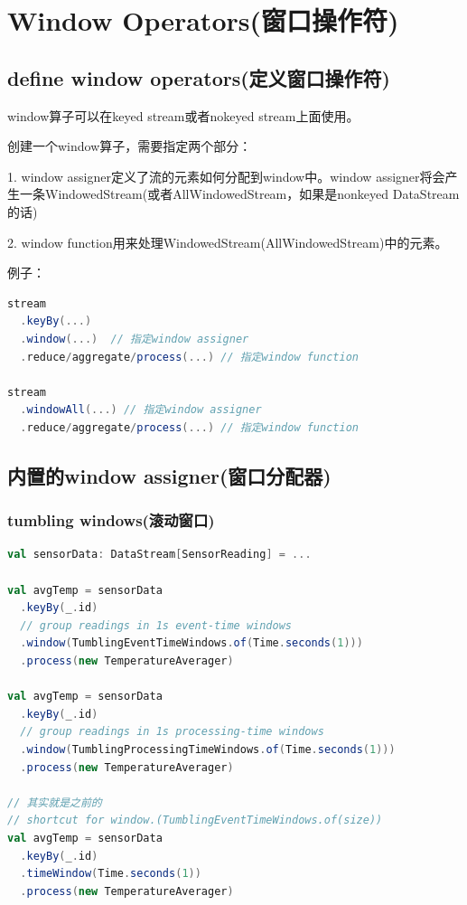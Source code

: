 \documentclass[oneside]{ctexbook}
\begin{document}
\section{Window Operators(窗口操作符)}

\subsection{define window operators(定义窗口操作符)}

window算子可以在keyed stream或者nokeyed stream上面使用。

创建一个window算子，需要指定两个部分：

1. window assigner定义了流的元素如何分配到window中。window assigner将会产生一条WindowedStream(或者AllWindowedStream，如果是nonkeyed DataStream的话)

2. window function用来处理WindowedStream(AllWindowedStream)中的元素。

例子：

\begin{lstlisting}[language=scala]
stream
  .keyBy(...)
  .window(...)  // 指定window assigner
  .reduce/aggregate/process(...) // 指定window function

stream
  .windowAll(...) // 指定window assigner
  .reduce/aggregate/process(...) // 指定window function
\end{lstlisting}

\subsection{内置的window assigner(窗口分配器)}

\subsubsection{tumbling windows(滚动窗口)}

\begin{lstlisting}[language=scala]
val sensorData: DataStream[SensorReading] = ...

val avgTemp = sensorData
  .keyBy(_.id)
  // group readings in 1s event-time windows
  .window(TumblingEventTimeWindows.of(Time.seconds(1)))
  .process(new TemperatureAverager)

val avgTemp = sensorData
  .keyBy(_.id)
  // group readings in 1s processing-time windows
  .window(TumblingProcessingTimeWindows.of(Time.seconds(1)))
  .process(new TemperatureAverager)

// 其实就是之前的
// shortcut for window.(TumblingEventTimeWindows.of(size))
val avgTemp = sensorData
  .keyBy(_.id)
  .timeWindow(Time.seconds(1))
  .process(new TemperatureAverager)
\end{lstlisting}
\end{document}

